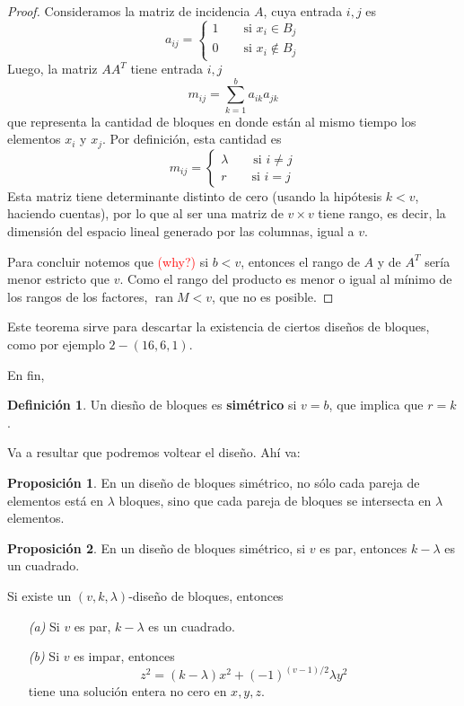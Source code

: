 \documentclass[spanish]{book}
\theoremstyle{definition}
\newtheorem*{defn}{Definición}
\newtheorem*{prop}{Proposición}
\DeclareMathOperator{\ran}{ran}
\begin{document}
\begin{proof}
	Consideramos la matriz de incidencia $A$, cuya entrada $i,j$ es
	\[a_{ij}=\begin{cases}
		1\qquad\text{si }x_i\in B_j\\
		0\qquad\text{si }x_i\notin B_j
	\end{cases}\]
	Luego, la matriz $AA^T$ tiene entrada $i,j$
	\[m_{ij}=\sum_{k=1}^ba_{ik}a_{jk}\]
	que representa la cantidad de bloques en donde están al mismo tiempo los elementos $x_i$ y $x_j$. Por definición, esta cantidad es
	\[m_{ij}=\begin{cases}
		\lambda\qquad\text{si }i\neq j\\
		r\qquad\text{si }i=j
	\end{cases}\]
	Esta matriz tiene determinante distinto de cero (usando la hipótesis $k<v$, haciendo cuentas), por lo que al ser una matriz de $v\times v$ tiene rango, es decir, la dimensión del espacio lineal generado por las columnas, igual a $v$.
	
	Para concluir notemos que \textcolor{red}{(why?)} si $b<v$, entonces el rango de $A$ y de $A^T$ sería menor estricto que $v$. Como el rango del producto es menor o igual al mínimo de los rangos de los factores, $\ran M<v$, que no es posible.
\end{proof}
Este teorema sirve para descartar la existencia de ciertos diseños de bloques, como por ejemplo $2-(16,6,1)$.

En fin,
\begin{defn}
	Un diesño de bloques es \textbf{simétrico} si $v=b$, que implica que $r=k$.
\end{defn}
Va a resultar que podremos voltear el diseño. Ahí va:
\begin{prop}
	En un diseño de bloques simétrico, no sólo cada pareja de elementos está en $\lambda$ bloques, sino que cada pareja de bloques se intersecta en $\lambda$ elementos.
\end{prop}
\begin{prop}
	En un diseño de bloques simétrico, si $v$ es par, entonces $k-\lambda$ es un cuadrado.
\end{prop}
\begin{teo}
	Si existe un $(v,k,\lambda)$-diseño de bloques, entonces
	\begin{enumerate}
		\item[\textit{(a)}] Si $v$ es par, $k-\lambda$ es un cuadrado.
		\item[\textit{(b)}] Si $v$ es impar, entonces
		\[z^2=(k-\lambda)x^2+(-1)^{(v-1)/2}\lambda y^2\]
		tiene una solución entera no cero en $x,y,z$.
	\end{enumerate}
\end{teo}
\end{document}
